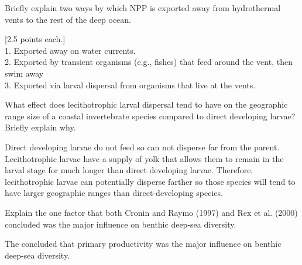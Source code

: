 \documentclass[11pt]{exam}
\begin{document}
\begin{questions}
%

\newpage


\question[5]
Briefly explain two ways by which NPP is exported away from hydrothermal vents to the rest of the deep ocean.

\begin{minipage}[t][1in]{\textwidth}%
\begin{solution}

[2.5 points each.] \\
1. Exported away on water currents. \\
2. Exported by transient organisms (e.g., fishes) that feed around the vent, then swim away\\
3. Exported via larval dispersal from organisms that live at the vents.
\end{solution}%
\end{minipage}

\question[5]
What effect does lecithotrophic larval dispersal tend to have on the geographic range size of a coastal invertebrate species compared to direct developing larvae? Briefly explain why.

\begin{minipage}[t][1in]{\textwidth}%
\begin{solution}
Direct developing larvae do not feed so can not disperse far from the parent. Lecithotrophic larvae have a supply of yolk that allows them to remain in the larval stage for much longer than direct developing larvae. Therefore, lecithotrophic larvae can potentially disperse farther so those species will tend to have larger geographic ranges than direct-developing species.
\end{solution}%
\end{minipage}

\question[10]
Explain the one factor that both Cronin and Raymo (1997) and Rex et al. (2000) concluded was the major influence on benthic deep-sea diversity.

\begin{minipage}[t][2in]{\textwidth}%
\begin{solution}
The concluded that primary productivity was the major influence on benthic deep-sea diversity.
\end{solution}%
\end{minipage}


\end{questions}
\end{document}
